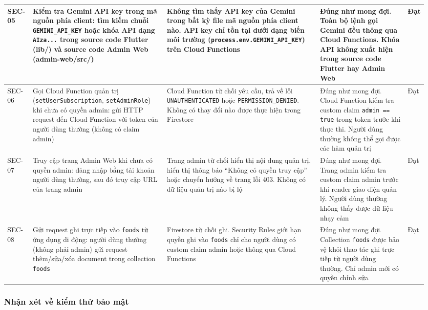 \begin{longtable}{|p{1.8cm}|p{4.5cm}|p{4cm}|p{3cm}|p{1.5cm}|}
    \hline
    SEC-05 & Kiểm tra Gemini API key trong mã nguồn phía client: tìm kiếm chuỗi \texttt{GEMINI\_API\_KEY} hoặc khóa API dạng \texttt{AIza...} trong source code Flutter (lib/) và source code Admin Web (admin-web/src/) & Không tìm thấy API key của Gemini trong bất kỳ file mã nguồn phía client nào. API key chỉ tồn tại dưới dạng biến môi trường (\texttt{process.env.GEMINI\_API\_KEY}) trên Cloud Functions & Đúng như mong đợi. Toàn bộ lệnh gọi Gemini đều thông qua Cloud Functions. Khóa API không xuất hiện trong source code Flutter hay Admin Web & Đạt \\
    \hline
    SEC-06 & Gọi Cloud Function quản trị (\texttt{setUserSubscription}, \texttt{setAdminRole}) khi chưa có quyền admin: gửi HTTP request đến Cloud Function với token của người dùng thường (không có claim admin) & Cloud Function từ chối yêu cầu, trả về lỗi \texttt{UNAUTHENTICATED} hoặc \texttt{PERMISSION\_DENIED}. Không có thay đổi nào được thực hiện trong Firestore & Đúng như mong đợi. Cloud Function kiểm tra custom claim \texttt{admin == true} trong token trước khi thực thi. Người dùng thường không thể gọi được các hàm quản trị & Đạt \\
    \hline
    SEC-07 & Truy cập trang Admin Web khi chưa có quyền admin: đăng nhập bằng tài khoản người dùng thường, sau đó truy cập URL của trang admin & Trang admin từ chối hiển thị nội dung quản trị, hiển thị thông báo ``Không có quyền truy cập'' hoặc chuyển hướng về trang lỗi 403. Không có dữ liệu quản trị nào bị lộ & Đúng như mong đợi. Trang admin kiểm tra custom claim admin trước khi render giao diện quản lý. Người dùng thường không thấy được dữ liệu nhạy cảm & Đạt \\
    \hline
    SEC-08 & Gửi request ghi trực tiếp vào \texttt{foods} từ ứng dụng di động: người dùng thường (không phải admin) gửi request thêm/sửa/xóa document trong collection \texttt{foods} & Firestore từ chối ghi. Security Rules giới hạn quyền ghi vào \texttt{foods} chỉ cho người dùng có custom claim admin hoặc thông qua Cloud Functions & Đúng như mong đợi. Collection \texttt{foods} được bảo vệ khỏi thao tác ghi trực tiếp từ người dùng thường. Chỉ admin mới có quyền chỉnh sửa & Đạt \\
    \hline
\end{longtable}
\endgroup

\subsubsection{Nhận xét về kiểm thử bảo mật}

